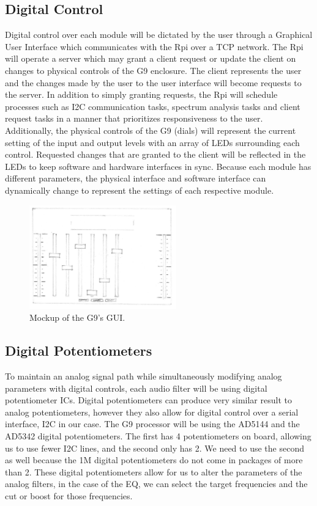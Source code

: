 \documentclass[journal]{IEEEtran}
\begin{document}
	
	
	\subsection{Digital Control}
	Digital control over each module will be dictated by the user through a Graphical User Interface which communicates with the Rpi over a TCP network.  The Rpi will operate a server which may grant a client request or update the client on changes to physical controls of the G9 enclosure.  The client represents the user and the changes made by the user to the user interface will become requests to the server.  In addition to simply granting requests, the Rpi will schedule processes such as I2C communication tasks, spectrum analysis tasks and client request tasks in a manner that prioritizes responsiveness to the user.  Additionally, the physical controls of the G9 (dials) will represent the current setting of the input and output levels with an array of LEDs surrounding each control.  Requested changes that are granted to the client will be reflected in the LEDs to keep software and hardware interfaces in sync.  Because each module has different parameters, the physical interface and software interface can dynamically change to represent the settings of each respective module.
	
	
	
	\begin{figure}
		\centering
		\includegraphics[width=2.5in]{gui}
		\caption{Mockup of the G9's GUI. }
		\label{fig:gui}
	\end{figure}
	
	
	\subsection{Digital Potentiometers}
	To maintain an analog signal path while simultaneously modifying analog parameters with digital controls, each audio filter will be using digital potentiometer ICs.  Digital potentiometers can produce very similar result to analog potentiometers, however they also allow for digital control over a serial interface, I2C in our case.  The G9 processor will be using the AD5144 and the AD5342 digital potentiometers.  The first has 4 potentiometers on board, allowing us to use fewer I2C lines, and the second only has 2.  We need to use the second as well because the 1M digital potentiometers do not come in packages of more than 2. These digital potentiometers allow for us to alter the parameters of the analog filters, in the case of the EQ, we can select the target frequencies and the cut or boost for those frequencies.
	
\end{document}
